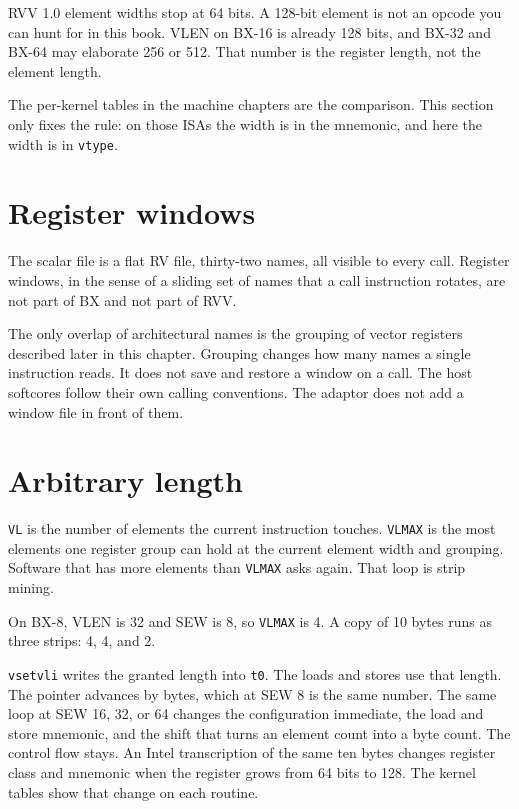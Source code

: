 RVV 1.0 element widths stop at 64 bits. A 128-bit element is not an opcode you can hunt for in this book. VLEN on BX-16 is already 128 bits, and BX-32 and BX-64 may elaborate 256 or 512. That number is the register length, not the element length.

The per-kernel tables in the machine chapters are the comparison. This section only fixes the rule: on those ISAs the width is in the mnemonic, and here the width is in \texttt{vtype}.

\section{Register windows}

The scalar file is a flat RV file, thirty-two names, all visible to every call. Register windows, in the sense of a sliding set of names that a call instruction rotates, are not part of BX and not part of RVV.

The only overlap of architectural names is the grouping of vector registers described later in this chapter. Grouping changes how many names a single instruction reads. It does not save and restore a window on a call. The host softcores follow their own calling conventions. The adaptor does not add a window file in front of them.

\section{Arbitrary length}

\texttt{VL} is the number of elements the current instruction touches. \texttt{VLMAX} is the most elements one register group can hold at the current element width and grouping. Software that has more elements than \texttt{VLMAX} asks again. That loop is strip mining.

On BX-8, VLEN is 32 and SEW is 8, so \texttt{VLMAX} is 4. A copy of 10 bytes runs as three strips: 4, 4, and 2.



\texttt{vsetvli} writes the granted length into \texttt{t0}. The loads and stores use that length. The pointer advances by bytes, which at SEW 8 is the same number. The same loop at SEW 16, 32, or 64 changes the configuration immediate, the load and store mnemonic, and the shift that turns an element count into a byte count. The control flow stays. An Intel transcription of the same ten bytes changes register class and mnemonic when the register grows from 64 bits to 128. The kernel tables show that change on each routine.

